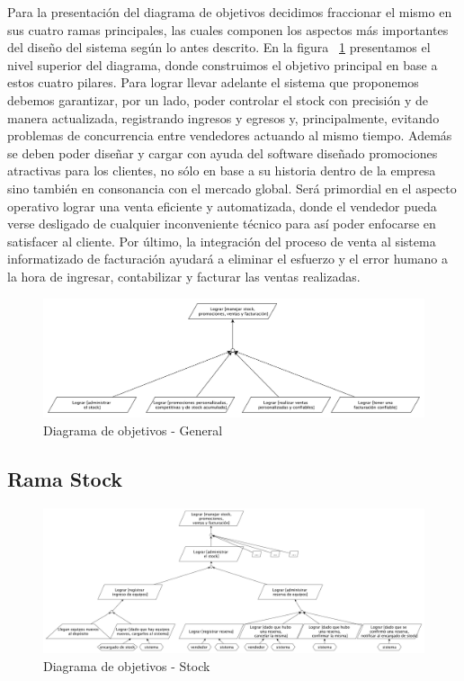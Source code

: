 Para la presentación del diagrama de objetivos decidimos fraccionar el mismo en sus cuatro ramas principales, las cuales componen los aspectos más importantes del diseño del sistema según lo antes descrito. En la figura ~\ref{fig:diagGen} presentamos el nivel superior del diagrama, donde construimos el objetivo principal en base a estos cuatro pilares. Para lograr llevar adelante el sistema que proponemos debemos garantizar, por un lado, poder controlar el stock con precisión y de manera actualizada, registrando ingresos y egresos y, principalmente, evitando problemas de concurrencia entre vendedores actuando al mismo tiempo. Además se deben poder diseñar y cargar con ayuda del software diseñado promociones atractivas para los clientes, no sólo en base a su historia dentro de la empresa sino también en consonancia con el mercado global. Será primordial en el aspecto operativo lograr una venta eficiente y automatizada, donde el vendedor pueda verse desligado de cualquier inconveniente técnico para así poder enfocarse en satisfacer al cliente. Por último, la integración del proceso de venta al sistema informatizado de facturación ayudará a eliminar el esfuerzo y el error humano a la hora de ingresar, contabilizar y facturar las ventas realizadas.

\begin{figure}[h!]
  \centering
  \includegraphics[width=1\textwidth]{./imagenes/general_top.pdf}
  \caption{Diagrama de objetivos - General}
  \label{fig:diagGen}
\end{figure}


\subsection{Rama Stock}

\begin{figure}[h!]
  \centering
  \includegraphics[width=1\textwidth]{./imagenes/stock.pdf}
  \caption{Diagrama de objetivos - Stock}
  \label{fig:diagStock}
\end{figure}

